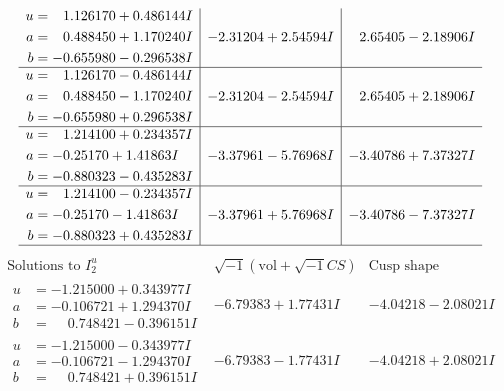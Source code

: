 \documentclass[1p]{elsarticle_modified}
\theoremstyle{definition}
\newcommand{\I}{\sqrt{-1}}
\begin{document}
$$\begin{array}{c|c|c}
\begin{aligned}
u &= \phantom{-}1.126170 + 0.486144 I \\
a &= \phantom{-}0.488450 + 1.170240 I \\
b &= -0.655980 - 0.296538 I\end{aligned}
 & -2.31204 + 2.54594 I & \phantom{-}2.65405 - 2.18906 I \\ \hline\begin{aligned}
u &= \phantom{-}1.126170 - 0.486144 I \\
a &= \phantom{-}0.488450 - 1.170240 I \\
b &= -0.655980 + 0.296538 I\end{aligned}
 & -2.31204 - 2.54594 I & \phantom{-}2.65405 + 2.18906 I \\ \hline\begin{aligned}
u &= \phantom{-}1.214100 + 0.234357 I \\
a &= -0.25170 + 1.41863 I \\
b &= -0.880323 - 0.435283 I\end{aligned}
 & -3.37961 - 5.76968 I & -3.40786 + 7.37327 I \\ \hline\begin{aligned}
u &= \phantom{-}1.214100 - 0.234357 I \\
a &= -0.25170 - 1.41863 I \\
b &= -0.880323 + 0.435283 I\end{aligned}
 & -3.37961 + 5.76968 I & -3.40786 - 7.37327 I\\
 \hline 
 \end{array}$$\newpage$$\begin{array}{c|c|c}  
\text{Solutions to }I^u_{2}& \I (\text{vol} + \sqrt{-1}CS) & \text{Cusp shape}\\
 \hline 
\begin{aligned}
u &= -1.215000 + 0.343977 I \\
a &= -0.106721 + 1.294370 I \\
b &= \phantom{-}0.748421 - 0.396151 I\end{aligned}
 & -6.79383 + 1.77431 I & -4.04218 - 2.08021 I \\ \hline\begin{aligned}
u &= -1.215000 - 0.343977 I \\
a &= -0.106721 - 1.294370 I \\
b &= \phantom{-}0.748421 + 0.396151 I\end{aligned}
 & -6.79383 - 1.77431 I & -4.04218 + 2.08021 I \\ \hline\begin{aligned}

\end{aligned}
\end{array}$$
\end{document}
